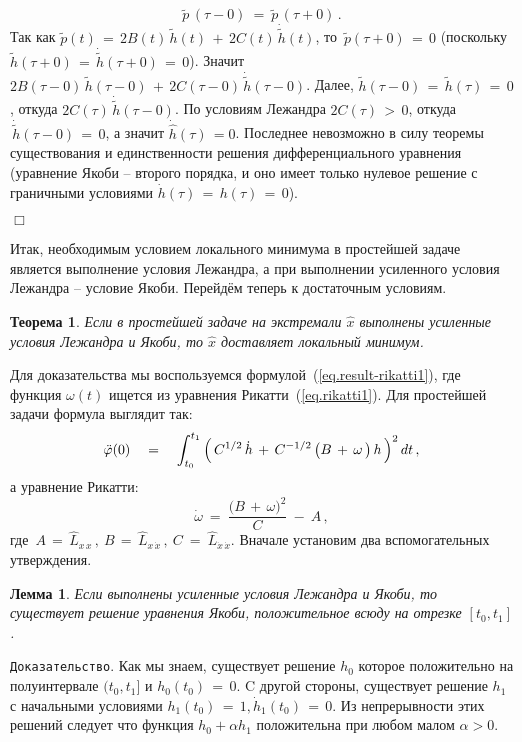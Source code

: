 \documentclass[12pt,a4paper]{article}
\newtheorem{theorem}{Теорема}
\newtheorem{lemma}{Лемма}
\begin{document}
$$
\tilde p\, (\tau - 0)\ = \ \tilde p\, (\tau +0)\, .
$$
 Так как $\tilde p(t)\, = \,
2B(t)\, \tilde h(t)\, + \, 2C(t)\, \dot {\tilde h}(t)$, то $\,
\tilde p(\tau +0)\, = \, 0$ (поскольку $\tilde h(\tau + 0)\, = \,
\dot {\tilde h}(\tau + 0)\, = \, 0$). Значит $2B(\tau - 0)\,
\tilde h(\tau - 0)\, + \, 2C(\tau - 0)\, \dot {\tilde h}(\tau -
0)$. Далее, $\tilde h(\tau - 0)\, = \, \tilde h (\tau)\, = \, 0$,
откуда $2C(\tau)\, \dot {\tilde h}(\tau - 0)$. По условиям
Лежандра $2C(\tau) \, > \, 0$, откуда $\, \dot {\tilde h}(\tau -
0)\, = \, 0$, а значит $\dot {\hat h}(\tau)\, = 0$. Последнее
невозможно в силу теоремы существования и единственности решения
дифференциального уравнения (уравнение Якоби -- второго порядка, и
оно имеет только нулевое решение с граничными условиями $\dot
h(\tau)\, =  \, h(\tau)\, = \, 0$).


{\hfill $\Box$}
\smallskip

Итак, необходимым условием локального минимума в простейшей задаче
является выполнение условия Лежандра, а при выполнении усиленного
условия Лежандра -- условие Якоби. Перейдём теперь к достаточным
условиям.
\begin{theorem}\label{th.LJ}
Если в простейшей задаче на  экстремали $\hat x$ выполнены
усиленные условия Лежандра и Якоби, то $\hat x$ доставляет локальный
минимум.
\end{theorem}
Для доказательства мы воспользуемся
формулой~(\ref{eq.result-rikatti1}), где функция $\omega(t)$
ищется из уравнения Рикатти~(\ref{eq.rikatti1}). Для простейшей
задачи формула выглядит так:
\begin{equation}\label{eq.result-rikatti2}
\ddot \varphi(0)\quad = \quad \int_{t_0}^{t_1} \,  \Bigl(\,
C^{1/2}\, \dot h\, + \, C^{-1/2}\, \bigl( B\, +\, \omega \,
\bigr)\, h\,  \Bigr)^2 \, d t \, ,
\end{equation}
а уравнение Рикатти:
\begin{equation}\label{eq.rikatti2}
\dot \omega \ = \ \frac{\bigl( B \, + \, \omega\bigr)^2}{C}\ - \
A\, ,
\end{equation}
где $\, A \, = \, \hat L_{x \, x}\, , \ B \, = \, \hat L_{x \,
\dot x}\, , \ C \ = \ \hat L_{\dot x \, \dot x}$. Вначале
установим два вспомогательных утверждения.
\begin{lemma}\label{l.Jakobi-positive}
Если выполнены усиленные условия Лежандра и Якоби, то существует
решение уравнения Якоби, положительное всюду на отрезке $[t_0,
t_1]$.
\end{lemma}
{\tt Доказательство}. Как мы знаем, существует решение $h_0$
которое положительно на полуинтервале $(t_0, t_1]$ и $h_0(t_0)\, =
\, 0$. C другой стороны, существует решение $h_1$ с начальными
условиями $h_1(t_0)\, = \, 1, {\dot h_1}(t_0)\, = \, 0$. Из
непрерывности этих решений следует что функция $h_0 + \alpha h_1$
положительна при любом малом $\alpha > 0$.
\end{document}
